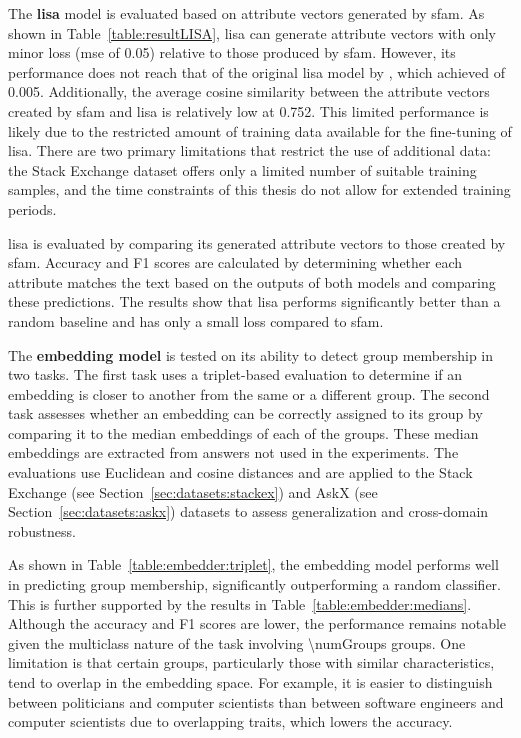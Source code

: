 The \textbf{\acs{lisa}} model is evaluated based on attribute vectors generated by \ac{sfam}. As shown in Table~\ref{table:resultLISA}, \ac{lisa} can generate attribute vectors with only minor loss (\acs{mse} of \num{0.05}) relative to those produced by \ac{sfam}. However, its performance does not reach that of the original \ac{lisa} model by \citet{patelLearningInterpretableStyle2023}, which achieved  of \num{0.005}. Additionally, the average cosine similarity between the attribute vectors created by \ac{sfam} and \ac{lisa} is relatively low at \num{0.752}. This limited performance is likely due to the restricted amount of training data available for the fine-tuning of \ac{lisa}. There are two primary limitations that restrict the use of additional data: the Stack Exchange dataset offers only a limited number of suitable training samples, and the time constraints of this thesis do not allow for extended training periods.

\begin{table}[ht]
  \caption[]{\ac{lisa} is evaluated by comparing its generated attribute vectors to those created by \ac{sfam}. Accuracy and F1 scores are calculated by determining whether each attribute matches the text based on the outputs of both models and comparing these predictions. The results show that \ac{lisa} performs significantly better than a random baseline and has only a small loss compared to \ac{sfam}.}%
  \label{table:resultLISA}
  \centering
  \resultLisa{}
\end{table}

The \textbf{embedding model} is tested on its ability to detect group membership in two tasks. The first task uses a triplet-based evaluation to determine if an embedding is closer to another from the same or a different group. The second task assesses whether an embedding can be correctly assigned to its group by comparing it to the median embeddings of each of the groups. These median embeddings are extracted from answers not used in the experiments. The evaluations use Euclidean and cosine distances and are applied to the Stack Exchange (see Section~\ref{sec:datasets:stackex}) and AskX (see Section~\ref{sec:datasets:askx}) datasets to assess generalization and cross-domain robustness.

As shown in Table~\ref{table:embedder:triplet}, the embedding model performs well in predicting group membership, significantly outperforming a random classifier. This is further supported by the results in Table~\ref{table:embedder:medians}. Although the accuracy and F1 scores are lower, the performance remains notable given the multiclass nature of the task involving \num{\numGroups} groups. One limitation is that certain groups, particularly those with similar characteristics, tend to overlap in the embedding space. For example, it is easier to distinguish between politicians and computer scientists than between software engineers and computer scientists due to overlapping traits, which lowers the accuracy.

